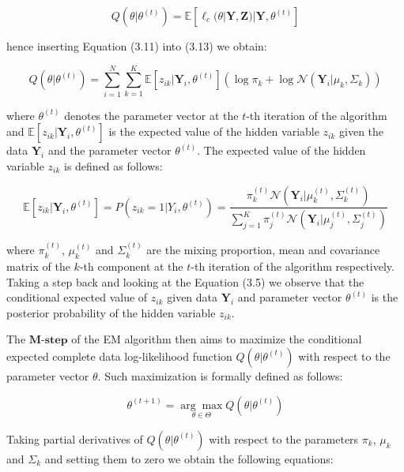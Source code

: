 \begin{equation}
    Q(\theta|\theta^{(t)}) = \mathbb{E}[\ell_c(\theta|\textbf{Y},\textbf{Z})|\textbf{Y},\theta^{(t)}]
\end{equation}

hence inserting Equation (3.11) into (3.13) we obtain:

\begin{equation}
    Q(\theta|\theta^{(t)}) = \sum_{i=1}^{N} \sum_{k=1}^{K} \mathbb{E}[z_{ik}|\textbf{Y}_i,\theta^{(t)}] \left(\log \pi_k + \log \mathcal{N}(\textbf{Y}_i|\mu_k,\Sigma_k)\right)
\end{equation}

where $\theta^{(t)}$ denotes the parameter vector at the $t$-th iteration of the algorithm and $\mathbb{E}[z_{ik}|\textbf{Y}_i,\theta^{(t)}]$ is the expected value of the hidden variable $z_{ik}$ given the data $\textbf{Y}_i$ and the parameter vector $\theta^{(t)}$.
The expected value of the hidden variable $z_{ik}$ is defined as follows:

\begin{equation}
    \mathbb{E}[z_{ik}|\textbf{Y}_i,\theta^{(t)}] = P(z_{ik} = 1|Y_i,\theta^{(t)}) = \frac{\pi_k^{(t)} \mathcal{N}(\textbf{Y}_i|\mu_k^{(t)},\Sigma_k^{(t)})}{\sum_{j=1}^{K} \pi_j^{(t)} \mathcal{N}(\textbf{Y}_i|\mu_j^{(t)},\Sigma_j^{(t)})}
\end{equation}

where $\pi_k^{(t)}$, $\mu_k^{(t)}$ and $\Sigma_k^{(t)}$ are the mixing proportion, mean and covariance matrix of the $k$-th component at the $t$-th iteration of the algorithm respectively.
Taking a step back and looking at the Equation (3.5) we observe that the conditional expected value of $z_{ik}$ given data $\textbf{Y}_i$ 
and parameter vector $\theta^{(t)}$ is the posterior probability of the hidden variable $z_{ik}$.

The $\textbf{M-step}$ of the EM algorithm then aims to maximize the conditional expected complete data log-likelihood function $Q(\theta|\theta^{(t)})$ with respect to the parameter vector $\theta$.
Such maximization is formally defined as follows:

\begin{equation}
    \theta^{(t+1)} = \underset{\theta \in \Theta}{\arg\max} Q(\theta|\theta^{(t)})
\end{equation}

Taking partial derivatives of $Q(\theta|\theta^{(t)})$ with respect to the parameters $\pi_k$, $\mu_k$ and $\Sigma_k$ and setting them to zero we obtain the following equations:

